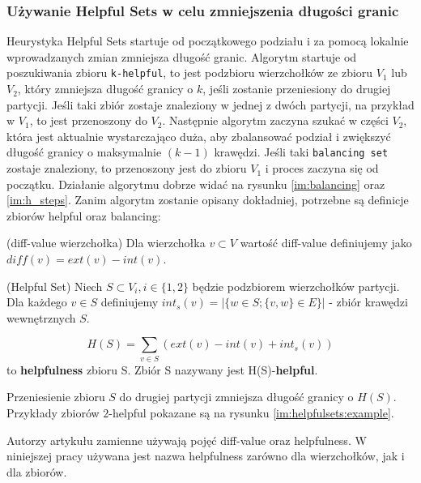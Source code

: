 \subsubsection{Używanie Helpful Sets w celu zmniejszenia długości granic}
Heurystyka Helpful Sets startuje od początkowego podziału i za pomocą lokalnie wprowadzanych zmian zmniejsza długość granic.
Algorytm startuje od poszukiwania zbioru \texttt{k-helpful}, to jest podzbioru wierzchołków ze zbioru $V_1$ lub $V_2$,
który zmniejsza długość granicy o $k$, jeśli zostanie przeniesiony do drugiej partycji.
Jeśli taki zbiór zostaje znaleziony w jednej z dwóch
partycji, na przykład w $V_1$, to jest przenoszony do $V_2$.
Następnie algorytm zaczyna szukać w części $V_2$, która
jest aktualnie wystarczająco duża, aby zbalansować podział i zwiększyć długość granicy o maksymalnie $(k-1)$ krawędzi.
Jeśli taki \texttt{balancing set} zostaje znaleziony, to przenoszony jest do zbioru $V_1$ i proces zaczyna się od początku.
Działanie algorytmu dobrze widać na rysunku \ref{im:balancing} oraz \ref{im:h_steps}.
Zanim algorytm zostanie opisany dokładniej, potrzebne są definicje zbiorów helpful oraz balancing:

\begin{definition}
(diff-value wierzchołka)\newline
Dla wierzchołka $v \subset V$ wartość diff-value definiujemy jako $diff(v) = ext(v) - int(v)$.
\end{definition}

\begin{definition}
(Helpful Set)\newline
Niech $S \subset V_i, i \in \{1,2\}$ będzie podzbiorem wierzchołków partycji. Dla każdego $v \in S$ definiujemy
$int_s(v) = |\{w \in S; \{v,w\} \in E\}|$ - zbiór krawędzi wewnętrznych $S$.

\begin{equation}
H(S)=\sum_{v \in S}(ext(v) - int(v) + int_s(v))
\label{eq:helpful_set2}
\end{equation}
to \textbf{helpfulness} zbioru S. Zbiór S nazywany jest H(S)-\textbf{helpful}.
\end{definition}

Przeniesienie zbioru $S$ do drugiej partycji zmniejsza długość granicy o $H(S)$.
Przykłady zbiorów $2$-helpful pokazane są na rysunku \ref{im:helpfulsets:example}.

Autorzy artykułu \cite{article} zamienne używają pojęć diff-value oraz helpfulness.
W niniejszej pracy używana jest nazwa helpfulness zarówno dla wierzchołków, jak i dla zbiorów.


